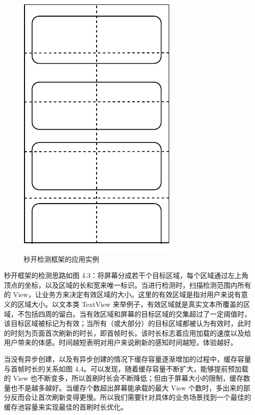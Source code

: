 \begin{figure}[H]
    \centering
    \includegraphics{assets/visibility-check.pdf}
    \caption{秒开检测框架的应用实例}
\end{figure}

秒开框架的检测思路如图 4.3：将屏幕分成若干个目标区域，每个区域通过左上角顶点的坐标，以及区域的长和宽来唯一标识。当进行检测时，扫描检测范围内所有的 View，让业务方来决定有效区域的大小。这里的有效区域是指对用户来说有意义的区域大小。以文本类 TextView 来举例子，有效区域就是真实文本所覆盖的区域，不包括四周的留白。当有效区域和屏幕的目标区域的交集超过了一定阈值时，该目标区域被标记为有效；当所有（或大部分）的目标区域都被认为有效时，此时的时刻为页面首次刷新的时长，即首帧时长。该时长标志着应用加载的速度以及给用户带来的体感。时间越短表明对用户来说刷新的感知时间越短，体验越好。



当没有异步创建，以及有异步创建的情况下缓存容量逐渐增加的过程中，缓存容量与首帧时长的关系如图 4.4。可以发现，随着缓存容量不断扩大，能够提前预加载的 View 也不断变多，所以首刷时长会不断降低；但由于屏幕大小的限制，缓存数量也不是越多越好。当缓存个数超出屏幕能承载的最大 View 个数时，多出来的部分反而会让首次刷新变得更慢。所以我们需要针对具体的业务场景找到一个最佳的缓存池容量来实现最佳的首刷时长优化。